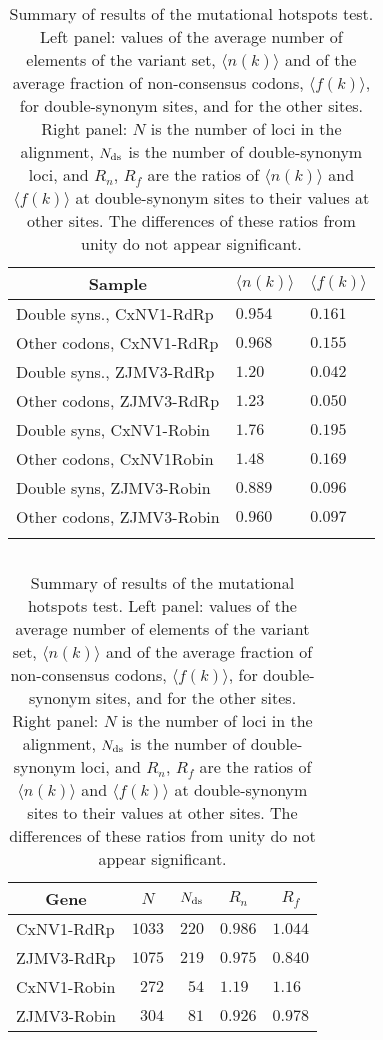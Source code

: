\documentclass[unnumsec,webpdf,contemporary,large]{oup-authoring-template}%
\theoremstyle{thmstyleone}%
\theoremstyle{thmstyletwo}%
\theoremstyle{thmstylethree}%
\begin{document}
\begin{table*}[h]
\caption{Summary of results of the mutational hotspots test. Left panel: values of the average number
of elements of the variant set, $\langle n(k)\rangle$ and of the average fraction of non-consensus
codons, $\langle f(k)\rangle$, for double-synonym sites,  and for the other sites.
Right panel: $N$ is the number of loci in the alignment, $N_{\rm ds}$ is the
number of double-synonym loci, and $R_n$, $R_f$ are the ratios of $\langle n(k)\rangle $
and $\langle f(k)\rangle$ at double-synonym sites to their values at other sites.
The differences of these ratios from unity do not appear significant.
\label{tab: 5.4}}
\begin{minipage}{0.45\textwidth}
\centering
\begin{tabular*}{\textwidth}{@{\extracolsep\fill}lll@{\extracolsep\fill}}
\toprule
\multicolumn{1}{c}{Sample}&
\multicolumn{1}{c}{$\langle n(k)\rangle$}&
\multicolumn{1}{c}{$\langle f(k)\rangle$}\\
\midrule
Double syns., CxNV1-RdRp  &$0.954$&$0.161$\\
Other codons, CxNV1-RdRp  &$0.968$&$0.155$\\
Double syns., ZJMV3-RdRp  &$1.20$&$0.042$\\
Other codons, ZJMV3-RdRp  &$1.23$&$0.050$\\
Double syns, CxNV1-Robin &$1.76$&$0.195$\\
Other codons, CxNV1Robin &$1.48$&$0.169$\\
Double syns, ZJMV3-Robin   &$0.889$&$0.096$\\
Other codons, ZJMV3-Robin &$0.960$&$0.097$\\
\botrule
\end{tabular*}
\end{minipage}
\begin{minipage}{0.10\textwidth}
$ $
\end{minipage}
\begin{minipage}{0.45\textwidth}
\centering
\begin{tabular*}{\textwidth}{@{\extracolsep\fill}lrrll@{\extracolsep\fill}}
\toprule
\multicolumn{1}{c}{Gene}&\multicolumn{1}{c}{$N$}&\multicolumn{1}{c}{$N_{\rm ds}$}
&\multicolumn{1}{c}{$R_n$}&\multicolumn{1}{c}{$R_f$}\\
\midrule
CxNV1-RdRp  &$1033$&$220$&$0.986$&$1.044$\\
ZJMV3-RdRp  &$1075$&$219$&$0.975$&$0.840$\\
CxNV1-Robin  &$272$&$54$&$1.19$&$1.16$\\
ZJMV3-Robin  &$304$&$81$&$0.926$&$0.978$\\
\midrule
\end{tabular*}
\end{minipage}
\end{table*}
\end{document}
